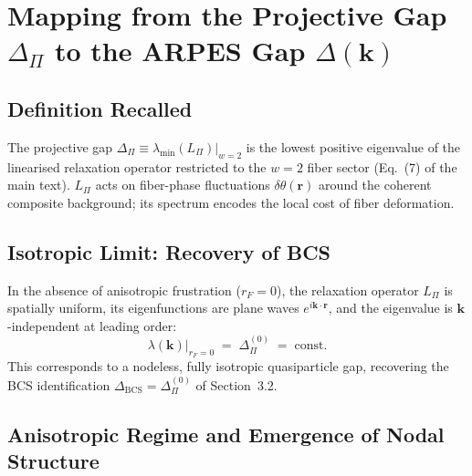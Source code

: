 \section{Mapping from the Projective Gap $\Delta_\Pi$ to the ARPES Gap
  $\Delta(\mathbf{k})$}
  \label{app:mapping}

  \subsection{Definition Recalled}
    \label{subsec:definition-recalled}

    The projective gap $\Delta_\Pi \equiv \lambda_{\min}(L_\Pi)|_{w=2}$ is the lowest positive
    eigenvalue of the linearised relaxation operator restricted to the $w = 2$ fiber sector
    (Eq.~(7) of the main text).
    $L_\Pi$ acts on fiber-phase fluctuations $\delta\theta(\mathbf{r})$ around the coherent
    composite background; its spectrum encodes the local cost of fiber deformation.

  \subsection{Isotropic Limit: Recovery of BCS}
    \label{subsec:isotropic-limit:-recovery-of-bcs}

    In the absence of anisotropic frustration ($r_F = 0$), the relaxation operator $L_\Pi$ is
    spatially uniform, its eigenfunctions are plane waves $e^{i\mathbf{k}\cdot\mathbf{r}}$, and
    the eigenvalue is $\mathbf{k}$-independent at leading order:
    \begin{equation}
      \lambda(\mathbf{k})\big|_{r_F=0} \;=\; \Delta_\Pi^{(0)} \;=\; \text{const.}
      \label{eq:DeltaPi_iso}
    \end{equation}
    This corresponds to a nodeless, fully isotropic quasiparticle gap, recovering the BCS
    identification $\Delta_\textrm{BCS} = \Delta_\Pi^{(0)}$ of Section~3.2.

  \subsection{Anisotropic Regime and Emergence of Nodal Structure}
    \label{subsec:anisotropic-regime-and-emergence-of-nodal-structure}

